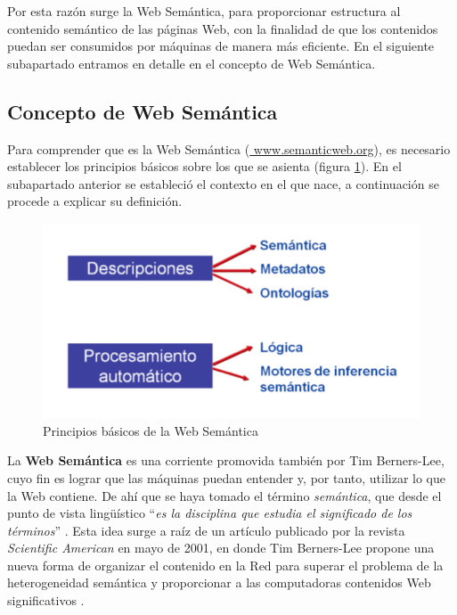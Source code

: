 Por esta razón surge la Web Semántica, para proporcionar estructura al contenido semántico de las páginas Web, con la finalidad de que los contenidos puedan ser consumidos por máquinas de manera más eficiente. En el siguiente subapartado entramos en detalle en el concepto de Web Semántica.

\subsection{Concepto de Web Semántica} 

Para comprender que es la Web Semántica (\url{ www.semanticweb.org}), es necesario establecer los principios básicos sobre los que se asienta (figura \ref{fig:principio}). En el subapartado anterior se estableció el contexto en el que nace, a continuación se procede a explicar su definición. 

\begin{figure}[H]
	\centering
	\includegraphics[width=0.57\linewidth]{imagenes/capitulo3/principio}
	\caption{Principios básicos de la Web Semántica \cite{aplicacion}}
	\label{fig:principio}
\end{figure}

La \textbf{Web Semántica} es una corriente promovida también por Tim Berners-Lee, cuyo fin es lograr que las máquinas puedan entender y, por tanto, utilizar lo que la Web contiene. De ahí que se haya tomado el término \textit{semántica}, que desde el punto de vista lingüístico ``\textit{es la disciplina que estudia el significado de los términos}'' \cite{cwb}. Esta idea surge a raíz de un artículo publicado por la revista \textit{Scientific American} en mayo de 2001, en donde Tim Berners-Lee propone una nueva forma de organizar el contenido en la Red para superar el problema de la heterogeneidad semántica y proporcionar a las computadoras contenidos Web significativos \cite{web-semantica-w3c, libro-gis}.\\




